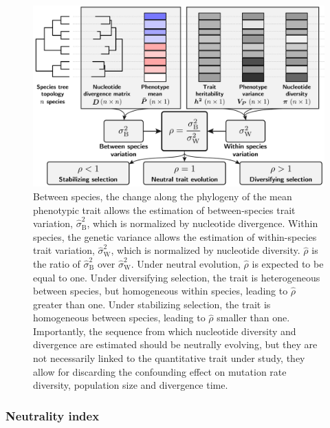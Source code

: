 \documentclass{article}
\newcommand{\EstRateBetween}{\widehat{\sigma}^2_{\mathrm{B}}} %
\newcommand{\EstRateWhithin}{\widehat{\sigma}^2_{\mathrm{W}}} %
\newcommand{\EstNI}{\widehat{\rho}}
\begin{document}
\begin{figure}[!ht]
    \centering
    \includegraphics[width=\textwidth, page=1] {figure1}
    \caption{
        Between species, the change along the phylogeny of the mean phenotypic trait allows the estimation of between-species trait variation, $\EstRateBetween$, which is normalized by nucleotide divergence.
        Within species, the genetic variance allows the estimation of within-species trait variation, $\EstRateWhithin$, which is  normalized by nucleotide diversity.
        $\EstNI$ is the ratio of $\EstRateBetween$ over $\EstRateWhithin$.
        Under neutral evolution, $\EstNI$ is expected to be equal to one.
        Under diversifying selection, the trait is heterogeneous between species, but homogeneous within species, leading to $\EstNI$ greater than one.
        Under stabilizing selection, the trait is homogeneous between species, leading to $\EstNI$ smaller than one.
        Importantly, the sequence from which nucleotide diversity and divergence are estimated should be neutrally evolving, but they are not necessarily linked to the quantitative trait under study, they allow for discarding the confounding effect on mutation rate diversity, population size and divergence time.
    }
    \label{fig:methods}
\end{figure}

\subsubsection*{Neutrality index}
\end{document}
